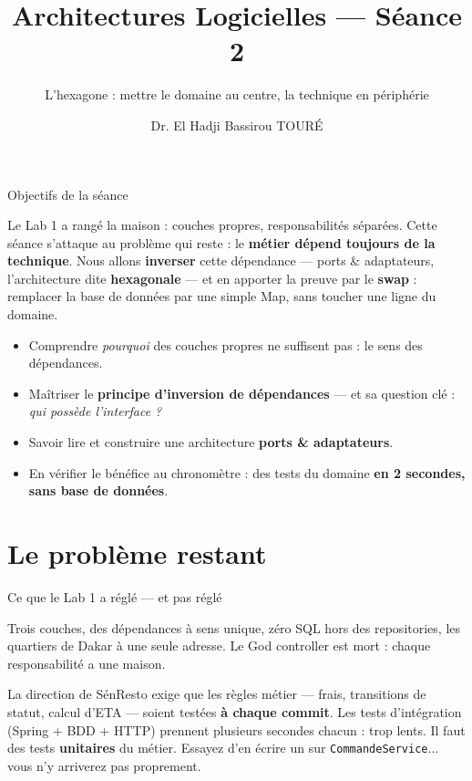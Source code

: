 \documentclass[aspectratio=169,11pt]{beamer}
\title{Architectures Logicielles — Séance 2}
\subtitle{L'hexagone : mettre le domaine au centre, la technique en périphérie}
\author{Dr. El Hadji Bassirou TOURÉ}
\institute{Département de Mathématiques et Informatique\\ Faculté des Sciences et Techniques\\ Université Cheikh Anta Diop de Dakar}
\date{}
\begin{document}
\begin{frame}\titlepage\end{frame}

\begin{frame}{Objectifs de la séance}
\begin{ucaddef}[Contenu]
{\small Le Lab 1 a rangé la maison : couches propres, responsabilités séparées. Cette séance s'attaque au problème qui reste : le \textbf{métier dépend toujours de la technique}. Nous allons \textbf{inverser} cette dépendance — ports \& adaptateurs, l'architecture dite \textbf{hexagonale} — et en apporter la preuve par le \textbf{swap} : remplacer la base de données par une simple Map, sans toucher une ligne du domaine.}
\end{ucaddef}
\begin{itemize}\small
  \item Comprendre \emph{pourquoi} des couches propres ne suffisent pas : le sens des dépendances.
  \item Maîtriser le \textbf{principe d'inversion de dépendances} — et sa question clé : \emph{qui possède l'interface ?}
  \item Savoir lire et construire une architecture \textbf{ports \& adaptateurs}.
  \item En vérifier le bénéfice au chronomètre : des tests du domaine \textbf{en 2 secondes, sans base de données}.
\end{itemize}
\end{frame}

\section{Le problème restant}

\begin{frame}{Ce que le Lab 1 a réglé — et pas réglé}
\begin{ucadex}
{\small Trois couches, des dépendances à sens unique, zéro SQL hors des repositories, les quartiers de Dakar à une seule adresse. Le God controller est mort : chaque responsabilité a une maison.}
\end{ucadex}
\begin{ucadpiege}
{\small La direction de SénResto exige que les règles métier — frais, transitions de statut, calcul d'ETA — soient testées \textbf{à chaque commit}. Les tests d'intégration (Spring + BDD + HTTP) prennent plusieurs secondes chacun : trop lents. Il faut des tests \textbf{unitaires} du métier. Essayez d'en écrire un sur \texttt{CommandeService}... vous n'y arriverez pas proprement.}
\end{ucadpiege}
\end{frame}
\end{document}

